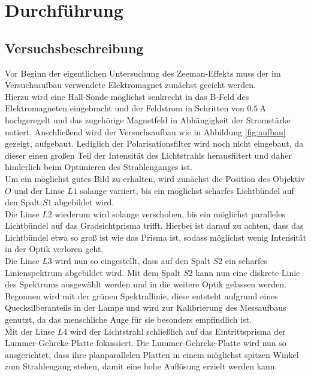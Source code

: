 \section{Durchführung}
\label{sec:Durchführung}



\subsection{Versuchsbeschreibung}
\label{sec:Versuchsbeschreibung}
Vor Beginn der eigentlichen Untersuchung des Zeeman-Effekts muss der im Versuchsaufbau verwendete Elektromagnet zunächst geeicht werden.\\
Hierzu wird eine Hall-Sonde möglichst senkrecht in das B-Feld des Elektromagneten eingebracht und der Feldstrom in Schritten von $\SI{0.5}{\ampere}$ hochgeregelt und das zugehörige Magnetfeld in Abhängigkeit der Stromstärke notiert.
Anschließend wird der Versuchsaufbau wie in Abbildung \ref{fig:aufbau} gezeigt, aufgebaut. Lediglich der Polarisationsfilter wird noch nicht eingebaut, da dieser einen großen Teil der Intensität des Lichtstrahls herausfiltert und daher hinderlich beim Optimieren des Strahlenganges ist.\\
Um ein möglichst gutes Bild zu erhalten, wird zunächst die Position des Objektiv $O$ und der Linse $L1$ solange variiert, bis ein möglichst scharfes Lichtbündel auf den Spalt $S1$ abgebildet wird.\\
Die Linse $L2$ wiederum wird solange verschoben, bis ein möglichst paralleles Lichtbündel auf das Gradsichtprisma trifft.
Hierbei ist darauf zu achten, dass das Lichtbündel etwa so groß ist wie das Prisma ist, sodass möglichst wenig Intensität in der Optik verloren geht.\\
Die Linse $L3$ wird nun so eingestellt, dass auf den Spalt $S2$ ein scharfes Linienspektrum abgebildet wird. Mit dem Spalt $S2$ kann nun eine diskrete Linie des Spektrums ausgewählt werden und in die weitere Optik gelassen werden.\\
Begonnen wird mit der grünen Spektrallinie, diese entsteht aufgrund eines Quecksilberanteils in der Lampe und wird zur Kalibrierung des Messaufbaus genutzt, da das menschliche Auge für sie besonders empfindlich ist.\\
Mit der Linse $L4$ wird der Lichtstrahl schließlich auf das Eintrittsprisma der Lummer-Gehrcke-Platte fokussiert. Die Lummer-Gehrcke-Platte wird nun so ausgerichtet, dass ihre planparallelen Platten in einem möglichst spitzen Winkel zum Strahlengang stehen, damit eine hohe Auflösung erzielt werden kann.\\
